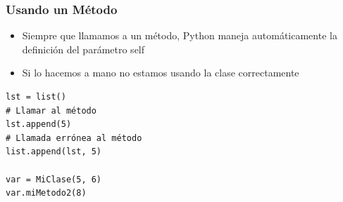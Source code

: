 \documentclass[11pt]{beamer}
\begin{document}
\begin{frame}[fragile]\frametitle{Usando un Método}
\begin{itemize}
\item Siempre que llamamos a un método, Python maneja automáticamente la definición del parámetro self
\item Si lo hacemos a mano no estamos usando la clase correctamente
\end{itemize}
\begin{lstlisting}
lst = list()
# Llamar al método
lst.append(5)
# Llamada errónea al método
list.append(lst, 5)

var = MiClase(5, 6)
var.miMetodo2(8)
\end{lstlisting}
\end{frame}
\end{document}
